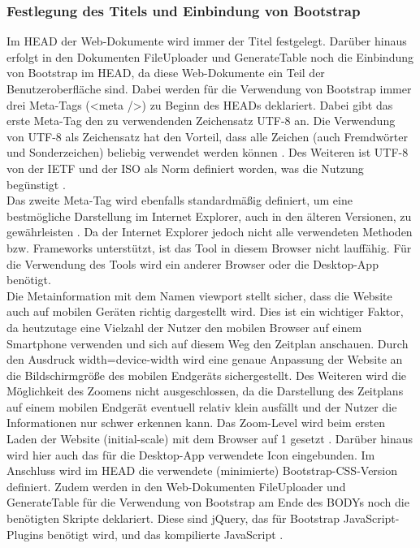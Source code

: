 \subsubsection{Festlegung des Titels und Einbindung von Bootstrap}
Im HEAD der Web-Dokumente wird immer der Titel festgelegt. 
Darüber hinaus erfolgt in den Dokumenten FileUploader und GenerateTable noch die Einbindung von Bootstrap im HEAD, da diese Web-Dokumente ein Teil der Benutzeroberfläche sind. 
Dabei werden für die Verwendung von Bootstrap immer drei Meta-Tags (<meta />) zu Beginn des HEADs deklariert. 
Dabei gibt das erste Meta-Tag den zu verwendenden Zeichensatz \ac{UTF-8} an. Die Verwendung von UTF-8 als Zeichensatz hat den Vorteil, dass alle Zeichen (auch Fremdwörter und Sonderzeichen) beliebig verwendet werden können \cite{kodierung}. Des Weiteren ist UTF-8 von der \ac{IETF} und der \ac{ISO} als Norm definiert worden, was die Nutzung begünstigt \cite{utf8}. \\
Das zweite Meta-Tag wird ebenfalls standardmäßig definiert, um eine bestmögliche Darstellung im Internet Explorer, auch in den älteren Versionen, zu gewährleisten \cite{meta}.  Da der Internet Explorer jedoch nicht alle verwendeten Methoden bzw. Frameworks unterstützt, ist das Tool in diesem Browser nicht lauffähig. Für die Verwendung des Tools wird ein anderer Browser oder die Desktop-App benötigt.\\
Die Metainformation mit dem Namen viewport stellt sicher, dass die Website auch auf mobilen Geräten richtig dargestellt wird. Dies ist ein wichtiger Faktor, da heutzutage eine Vielzahl der Nutzer den mobilen Browser auf einem Smartphone verwenden und sich auf diesem Weg den Zeitplan anschauen. Durch den Ausdruck width=device-width wird eine genaue Anpassung der Website an die Bildschirmgröße des mobilen Endgeräts sichergestellt. Des Weiteren wird die Möglichkeit des Zoomens nicht ausgeschlossen, da die Darstellung des Zeitplans auf einem mobilen Endgerät eventuell relativ klein ausfällt und der Nutzer die Informationen nur schwer erkennen kann. Das Zoom-Level wird beim ersten Laden der Website (initial-scale) mit dem Browser auf 1 gesetzt \cite{bootstrap2}. Darüber hinaus wird hier auch das für die Desktop-App verwendete Icon eingebunden.
Im Anschluss wird im HEAD die verwendete (minimierte) Bootstrap-CSS-Version definiert. 
Zudem werden in den Web-Dokumenten FileUploader und GenerateTable für die Verwendung von Bootstrap am Ende des BODYs noch die benötigten Skripte deklariert. Diese sind jQuery, das für Bootstrap JavaScript-Plugins benötigt wird, und das kompilierte JavaScript \cite{plugin}. 

